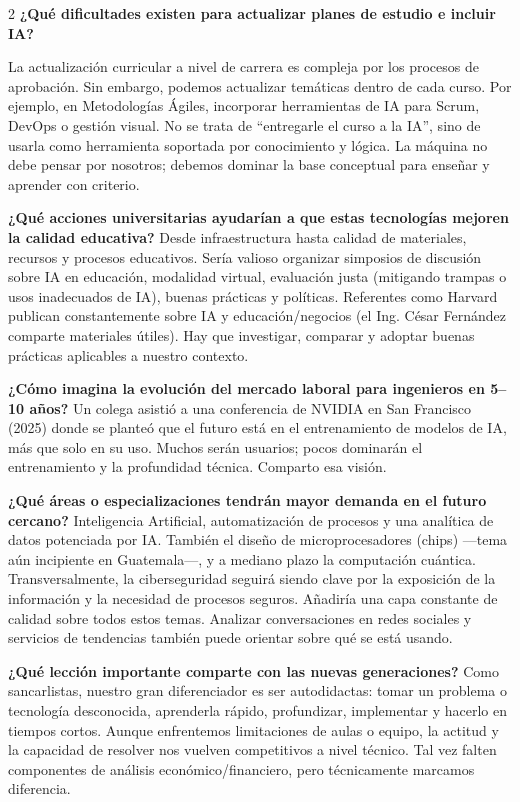 \documentclass[12pt,spanish,Letterpaper,openany]{book}
\begin{document}
\begin {multicols}{2}
\textbf{¿Qué dificultades existen para actualizar planes de estudio e incluir IA?}

La actualización curricular a nivel de carrera es compleja por los procesos de aprobación. Sin embargo, podemos actualizar temáticas dentro de cada curso. Por ejemplo, en Metodologías Ágiles, incorporar herramientas de IA para Scrum, DevOps o gestión visual.
No se trata de ``entregarle el curso a la IA'', sino de usarla como herramienta soportada por conocimiento y lógica. La máquina no debe pensar por nosotros; debemos dominar la base conceptual para enseñar y aprender con criterio.

\textbf{¿Qué acciones universitarias ayudarían a que estas tecnologías mejoren la calidad educativa?}
Desde infraestructura hasta calidad de materiales, recursos y procesos educativos. Sería valioso organizar simposios de discusión sobre IA en educación, modalidad virtual, evaluación justa (mitigando trampas o usos inadecuados de IA), buenas prácticas y políticas.
Referentes como Harvard publican constantemente sobre IA y educación/negocios (el Ing. César Fernández comparte materiales útiles). Hay que investigar, comparar y adoptar buenas prácticas aplicables a nuestro contexto.

\textbf{¿Cómo imagina la evolución del mercado laboral para ingenieros en 5--10 años?}
Un colega asistió a una conferencia de NVIDIA en San Francisco (2025) donde se planteó que el futuro está en el entrenamiento de modelos de IA, más que solo en su uso. Muchos serán usuarios; pocos dominarán el entrenamiento y la profundidad técnica. Comparto esa visión.

\textbf{¿Qué áreas o especializaciones tendrán mayor demanda en el futuro cercano?}
Inteligencia Artificial, automatización de procesos y una analítica de datos potenciada por IA. También el diseño de microprocesadores (chips) ---tema aún incipiente en Guatemala---, y a mediano plazo la computación cuántica.
Transversalmente, la ciberseguridad seguirá siendo clave por la exposición de la información y la necesidad de procesos seguros. Añadiría una capa constante de calidad sobre todos estos temas. Analizar conversaciones en redes sociales y servicios de tendencias también puede orientar sobre qué se está usando.

\textbf{¿Qué lección importante comparte con las nuevas generaciones?}
Como sancarlistas, nuestro gran diferenciador es ser autodidactas: tomar un problema o tecnología desconocida, aprenderla rápido, profundizar, implementar y hacerlo en tiempos cortos.
Aunque enfrentemos limitaciones de aulas o equipo, la actitud y la capacidad de resolver nos vuelven competitivos a nivel técnico. Tal vez falten componentes de análisis económico/financiero, pero técnicamente marcamos diferencia.


\end{multicols}
\end{document}
